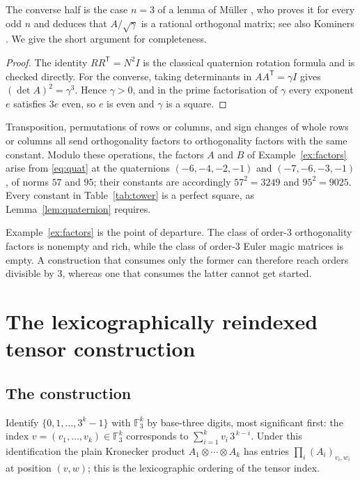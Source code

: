 \documentclass[11pt,a4paper]{amsart}
\theoremstyle{plain}
\theoremstyle{definition}
\theoremstyle{remark}
\newcommand{\FF}{\mathbb{F}}
\newcommand{\tr}{\mathsf{T}}
\begin{document}
The converse half is the case $n=3$ of a lemma of Müller
\cite[Lemma~2.1]{Muller2026}, who proves it for every odd $n$ and deduces that
$A/\sqrt{\gamma}$ is a rational orthogonal matrix; see also
Kominers \cite[Lemma~2.1]{Kominers2026}. We give the short argument for
completeness.

\begin{proof}
The identity $RR^{\tr}=N^2I$ is the classical quaternion rotation formula and is
checked directly. For the converse, taking determinants in $AA^{\tr}=\gamma I$
gives $(\det A)^2=\gamma^3$. Hence $\gamma>0$, and in the prime factorisation of
$\gamma$ every exponent $e$ satisfies $3e$ even, so $e$ is even and $\gamma$ is a
square.
\end{proof}

Transposition, permutations of rows or columns, and sign changes of whole rows
or columns all send orthogonality factors to orthogonality factors with the same
constant. Modulo these operations, the factors $A$ and $B$ of
Example~\ref{ex:factors} arise from \eqref{eq:quat} at the quaternions
$(-6,-4,-2,-1)$ and $(-7,-6,-3,-1)$, of norms $57$ and $95$; their constants are
accordingly $57^2=3249$ and $95^2=9025$. Every constant in
Table~\ref{tab:tower} is a perfect square, as Lemma~\ref{lem:quaternion}
requires.

Example~\ref{ex:factors} is the point of departure. The class of order-$3$
orthogonality factors is nonempty and rich, while the class of order-$3$ Euler
magic matrices is empty. A construction that consumes only the former can
therefore reach orders divisible by $3$, whereas one that consumes the latter
cannot get started.

\section{The lexicographically reindexed tensor construction}
\label{sec:construction}

\subsection{The construction}

Identify $\{0,1,\dots,3^k-1\}$ with $\FF_3^k$ by base-three digits, most
significant first: the index $v=(v_1,\dots,v_k)\in\FF_3^k$ corresponds to
$\sum_{i=1}^{k} v_i\,3^{\,k-i}$. Under this identification the plain Kronecker
product $A_1\otimes\cdots\otimes A_k$ has entries
$\prod_{i} (A_i)_{v_i,w_i}$ at position $(v,w)$; this is the lexicographic
ordering of the tensor index.
\end{document}
